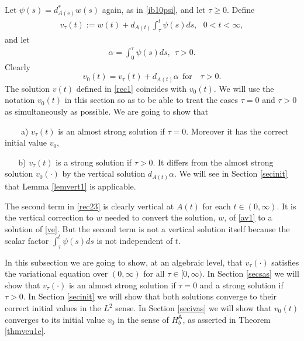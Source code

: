 \documentclass[12pt]{article}
\def \As{\mathsf{A}}
\def \beq{\begin{equation}}
\def \eeq{\end{equation}}
\def \eref{\eqref}
\numberwithin{equation}{section}
\begin{document}
   
Let $\psi(s) = d_{A(s)}^* w(s)$ again, as in \eref{ib10psi}, 
and let $\tau \ge 0$. 
Define  
\begin{align}
v_{\tau}(t) := w(t) + d_{A(t)}\int_\tau^t \psi(s)ds,  \ \ \ 0 < t <  \infty,            \label{rec23} 
\end{align}
and let
 \begin{align}
 \alpha =\int_0^\tau \psi(s) ds, \ \  \tau > 0. 
  \label{rec26}
 \end{align}
 Clearly   
\beq
v_0(t) = v_\tau(t) + d_{A(t)} \alpha\ \ \text{for }\ \ \ \tau >0.     
 \label{rec27} 
\eeq
 The solution $v(t)$ defined in \eref{rec1} coincides with $v_0(t)$. We will use the notation $v_0(t)$ in this 
 section so as to be able to treat the cases $\tau=0$ and $\tau >0$ as simultaneously as possible.
 We are going to show that      
 
 \noindent
\ \ \ \ a)  $v_\tau(t)$ is an almost strong solution if $\tau =0$. Moreover it has the correct initial value $v_0$, 
          
\noindent
\ \ \ \,b) $v_\tau(t)$ is a strong solution if $\tau >0$.  It differs from the almost strong solution $v_0(\cdot)$
 by the  vertical solution $d_{A(t)} \alpha$. 
 We will see in Section \ref{secinit}  
 that Lemma \ref{lemvert1} is applicable.
 


The second term in \eref{rec23}  is clearly vertical at $A(t)$ for each $t \in (0,  \infty)$.  
It is the vertical correction to $w$ needed to convert the solution, $w$,  of \eref{av1} to a solution of \eref{ve}.
But   the second term  
 is not a vertical solution itself because the scalar factor $\int_\tau^t \psi(s) ds$ 
 is not independent of $t$.


In this subsection we are going to show,  at an algebraic level, that 
$v_\tau(\cdot)$ satisfies the variational equation over $(0,  \infty)$ for all $\tau \in [0,\infty)$.
In Section \ref{secsas} we will show that 
$v_\tau(\cdot)$ is an almost strong solution if $\tau =0$ and a strong solution if $\tau  >0$.
In Section \ref{secinit} we will show that both solutions converge to their correct initial values in the $L^2$
sense.
In Section \ref{secivas}  
 we will show that $v_0(t)$ converges to 
its initial value $v_0$ in  the sense of $H_b^{\As}$, as asserted in  Theorem \ref{thmveu1e}.
\end{document}
